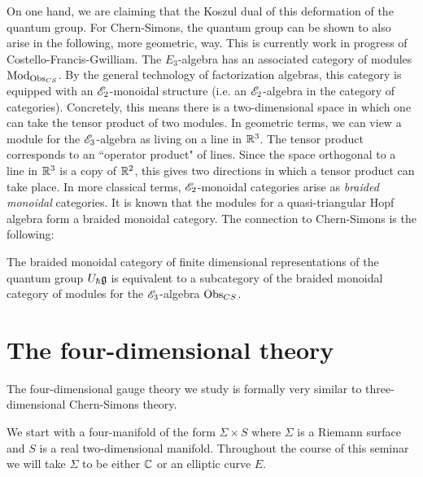 \documentclass[10pt]{amsart}
\begin{document}
On one hand, we are claiming that the Koszul dual of this deformation of the quantum group.
For Chern-Simons, the quantum group can be shown to also arise in the following, more geometric, way. 
This is currently work in progress of Costello-Francis-Gwilliam. 
The $E_3$-algebra has an associated category of modules ${\rm Mod}_{{\rm Obs}_{CS}}$. 
By the general technology of factorization algebras, this category is equipped with an $\mathscr E_2$-monoidal structure (i.e. an $\mathscr E_2$-algebra in the category of categories). 
Concretely, this means there is a two-dimensional space in which one can take the tensor product of two modules. 
In geometric terms, we can view a module for the $\mathscr E_3$-algebra as living on a line in $\mathbb R^3$.
The tensor product corresponds to an ``operator product" of lines.
Since the space orthogonal to a line in $\mathbb R^3$ is a copy of $\mathbb R^2$, this gives two directions in which a tensor product can take place. 
In more classical terms, $\mathscr E_2$-monoidal categories arise as {\em braided monoidal} categories. 
It is known that the modules for a quasi-triangular Hopf algebra form a braided monoidal category. 
The connection to Chern-Simons is the following:

\begin{thm}
The braided monoidal category of finite dimensional representations of the quantum group $U_{\hbar} \mathfrak g$ is equivalent to a subcategory of the braided monoidal category of modules for the $\mathscr E_3$-algebra ${\rm Obs}_{CS}$. 
\end{thm}

\section{The four-dimensional theory}

The four-dimensional gauge theory we study is formally very similar to three-dimensional Chern-Simons theory. 

We start with a four-manifold of the form $\Sigma \times S$ where $\Sigma$ is a Riemann surface and $S$ is a real two-dimensional manifold. 
Throughout the course of this seminar we will take $\Sigma$ to be either $\mathbb C$ or an elliptic curve $E$. 
\end{document}
